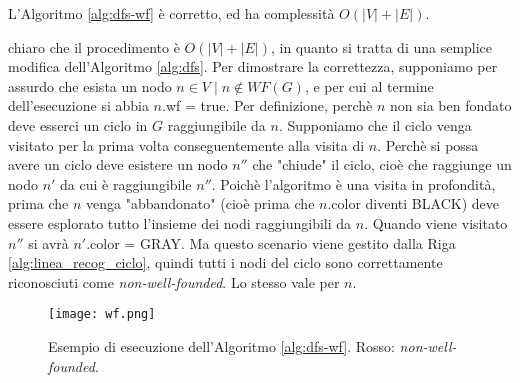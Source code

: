 \begin{observation}
    L'Algoritmo \ref{alg:dfs-wf} è corretto, ed ha complessità $O(|V| + |E|)$.
\end{observation}
\begin{proof2}
    \accente chiaro che il procedimento è $O(|V| + |E|)$, in quanto si tratta di una semplice modifica dell'Algoritmo \ref{alg:dfs}. Per dimostrare la correttezza, supponiamo per assurdo che esista un nodo $n \in V \mid n \not\in WF(G)$, e per cui al termine dell'esecuzione si abbia $n$.wf = true. Per definizione, perchè $n$ non sia ben fondato deve esserci un ciclo in $G$ raggiungibile da $n$. Supponiamo che il ciclo venga visitato per la prima volta conseguentemente alla visita di $n$. Perchè si possa avere un ciclo deve esistere un nodo $n''$ che "chiude" il ciclo, cioè che raggiunge un nodo $n'$ da cui è raggiungibile $n''$. Poichè l'algoritmo è una visita in profondità, prima che $n$ venga "abbandonato" (cioè prima che $n$.color diventi BLACK) deve essere esplorato tutto l'insieme dei nodi raggiungibili da $n$. Quando viene visitato $n''$ si avrà $n'$.color = GRAY. Ma questo scenario viene gestito dalla Riga \ref{alg:linea_recog_ciclo}, quindi tutti i nodi del ciclo sono correttamente riconosciuti come \emph{non-well-founded}. Lo stesso vale per $n$.
\end{proof2}
\begin{figure}[H]
    \centering
    \texttt{[image: wf.png]}
    \caption{Esempio di esecuzione dell'Algoritmo \ref{alg:dfs-wf}. Rosso: \emph{non-well-founded}.}
\end{figure}

